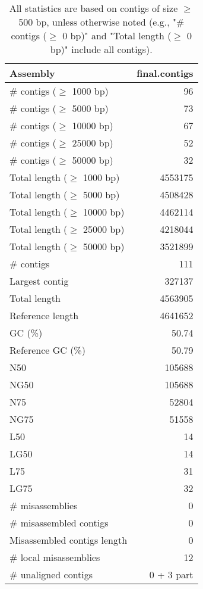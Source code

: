 \documentclass[12pt,a4paper]{article}
\begin{document}
\begin{table}[ht]
\begin{center}
\caption{All statistics are based on contigs of size $\geq$ 500 bp, unless otherwise noted (e.g., "\# contigs ($\geq$ 0 bp)" and "Total length ($\geq$ 0 bp)" include all contigs).}
\begin{tabular}{|l*{1}{|r}|}
\hline
Assembly & final.contigs \\ \hline
\# contigs ($\geq$ 1000 bp) & 96 \\ \hline
\# contigs ($\geq$ 5000 bp) & 73 \\ \hline
\# contigs ($\geq$ 10000 bp) & 67 \\ \hline
\# contigs ($\geq$ 25000 bp) & 52 \\ \hline
\# contigs ($\geq$ 50000 bp) & 32 \\ \hline
Total length ($\geq$ 1000 bp) & 4553175 \\ \hline
Total length ($\geq$ 5000 bp) & 4508428 \\ \hline
Total length ($\geq$ 10000 bp) & 4462114 \\ \hline
Total length ($\geq$ 25000 bp) & 4218044 \\ \hline
Total length ($\geq$ 50000 bp) & 3521899 \\ \hline
\# contigs & 111 \\ \hline
Largest contig & 327137 \\ \hline
Total length & 4563905 \\ \hline
Reference length & 4641652 \\ \hline
GC (\%) & 50.74 \\ \hline
Reference GC (\%) & 50.79 \\ \hline
N50 & 105688 \\ \hline
NG50 & 105688 \\ \hline
N75 & 52804 \\ \hline
NG75 & 51558 \\ \hline
L50 & 14 \\ \hline
LG50 & 14 \\ \hline
L75 & 31 \\ \hline
LG75 & 32 \\ \hline
\# misassemblies & 0 \\ \hline
\# misassembled contigs & 0 \\ \hline
Misassembled contigs length & 0 \\ \hline
\# local misassemblies & 12 \\ \hline
\# unaligned contigs & 0 + 3 part \\ \hline

\end{tabular}
\end{center}
\end{table}
\end{document}
